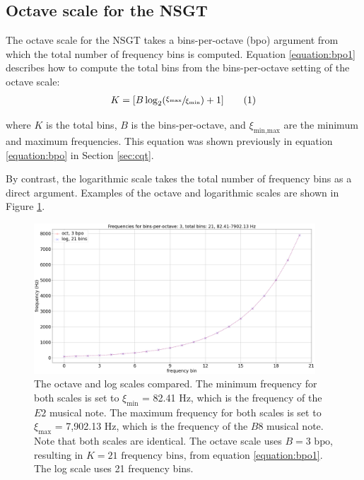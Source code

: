 \documentclass[report.tex]{subfiles}
\begin{document}
\begin{appendices}
\newpagefill

\section{Octave scale for the NSGT}
\label{appendix:octscale}

The octave scale for the NSGT takes a bins-per-octave (bpo) argument from which the total number of frequency bins is computed. Equation \eqref{equation:bpo1} describes how to compute the total bins from the bins-per-octave setting of the octave scale:
\begin{align}
	K = [B \log_{2}(\sfrac{\xi_{\text{max}}}{\xi_{\text{min}}}) + 1]\tag{1}\label{equation:bpo1}
\end{align}

where $K$ is the total bins, $B$ is the bins-per-octave, and $\xi_{\text{min,max}}$ are the minimum and maximum frequencies. This equation was shown previously in equation \eqref{equation:bpo} in Section \ref{sec:cqt}.

By contrast, the logarithmic scale takes the total number of frequency bins as a direct argument. Examples of the octave and logarithmic scales are shown in Figure \ref{fig:octvlog}.

\begin{figure}[ht]
	\centering
	\includegraphics[width=0.9375\textwidth]{./images-freqscales/log_vs_oct.png}
	\caption{The octave and log scales compared. The minimum frequency for both scales is set to $\xi_{\text{min}}$ = 82.41 Hz, which is the frequency of the $E2$ musical note. The maximum frequency for both scales is set to $\xi_{\text{max}}$ = 7,902.13 Hz, which is the frequency of the $B8$ musical note. Note that both scales are identical. The octave scale uses $B = 3 \text{ bpo}$, resulting in $K = 21 \text{ frequency bins}$, from equation \eqref{equation:bpo1}. The log scale uses 21 frequency bins.}
	\label{fig:octvlog}
\end{figure}


\end{appendices}
\end{document}
